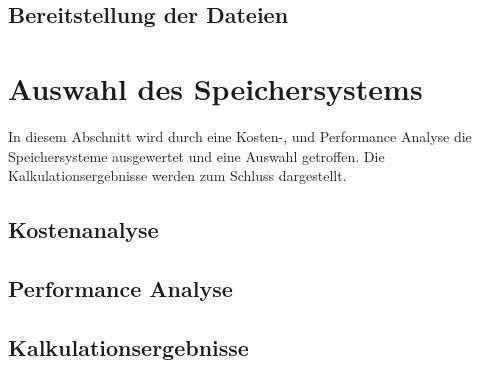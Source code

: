 \subsection{Bereitstellung der Dateien}

\section{Auswahl des Speichersystems}

In diesem Abschnitt wird durch eine Kosten-, und Performance Analyse die Speichersysteme ausgewertet und eine Auswahl getroffen. Die Kalkulationsergebnisse werden zum Schluss dargestellt.

\subsection{Kostenanalyse}
\subsection{Performance Analyse}
\subsection{Kalkulationsergebnisse}